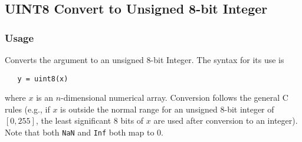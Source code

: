 %
%
%
\subsection{UINT8 Convert to Unsigned 8-bit Integer}
\subsubsection{Usage}
Converts the argument to an unsigned 8-bit Integer.  The syntax
for its use is
\begin{verbatim}
   y = uint8(x)
\end{verbatim}
where $x$ is an $n$-dimensional numerical array.  Conversion
follows the general C rules (e.g., if $x$ is outside the normal
range for an unsigned 8-bit integer of $[0,255]$, the least significant
8 bits of $x$ are used after conversion to an integer).  Note that
both \verb|NaN| and \verb|Inf| both map to 0.
